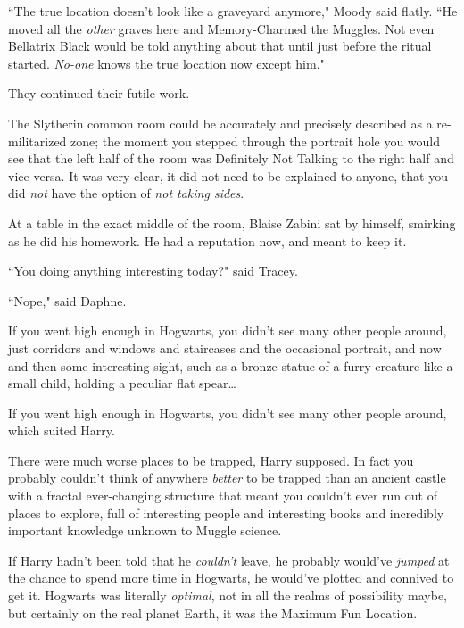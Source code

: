 ``The true location doesn't look like a graveyard anymore," Moody said flatly. ``He moved all the \emph{other} graves here and Memory-Charmed the Muggles. Not even Bellatrix Black would be told anything about that until just before the ritual started. \emph{No-one} knows the true location now except him."

They continued their futile work.


The Slytherin common room could be accurately and precisely described as a re-militarized zone; the moment you stepped through the portrait hole you would see that the left half of the room was Definitely Not Talking to the right half and vice versa. It was very clear, it did not need to be explained to anyone, that you did \emph{not} have the option of \emph{not taking sides}.

At a table in the exact middle of the room, Blaise Zabini sat by himself, smirking as he did his homework. He had a reputation now, and meant to keep it.


``You doing anything interesting today?" said Tracey.

``Nope," said Daphne.


If you went high enough in Hogwarts, you didn't see many other people around, just corridors and windows and staircases and the occasional portrait, and now and then some interesting sight, such as a bronze statue of a furry creature like a small child, holding a peculiar flat spear{\ldots}

If you went high enough in Hogwarts, you didn't see many other people around, which suited Harry.

There were much worse places to be trapped, Harry supposed. In fact you probably couldn't think of anywhere \emph{better} to be trapped than an ancient castle with a fractal ever-changing structure that meant you couldn't ever run out of places to explore, full of interesting people and interesting books and incredibly important knowledge unknown to Muggle science.

If Harry hadn't been told that he \emph{couldn't} leave, he probably would've \emph{jumped} at the chance to spend more time in Hogwarts, he would've plotted and connived to get it. Hogwarts was literally \emph{optimal}, not in all the realms of possibility maybe, but certainly on the real planet Earth, it was the Maximum Fun Location.

